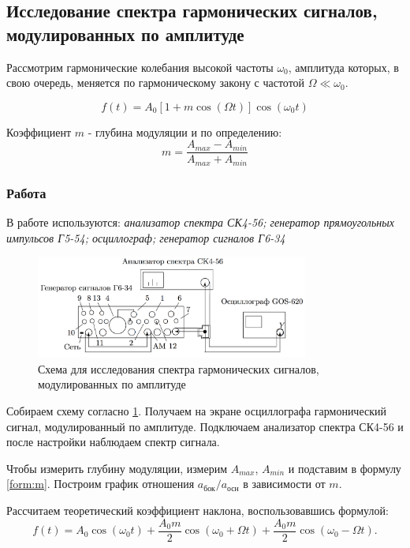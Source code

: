 \documentclass[a4paper, 12pt]{article}
\begin{document}
\subsection*{Исследование спектра гармонических сигналов, модулированных по амплитуде}

Рассмотрим гармонические колебания высокой частоты $\omega_0$, амплитуда которых, в свою очередь, меняется по гармоническому закону с частотой $\Omega \ll \omega_0$.

\begin{equation}
\label{form:amf(t)_a_n}
	f(t) = A_0[1+m\cos(\Omega t)]\cos(\omega_0t)
\end{equation}

Коэффициент $m$ - глубина модуляции и по определению:
\begin{equation}
\label{form:m}
	m = \frac{A_{max}-A_{min}}{A_{max}+A_{min}}
\end{equation}

\subsubsection*{Работа}
В работе используются: \textit{анализатор спектра СК4-56; генератор прямоугольных импульсов Г5-54; осциллограф; генератор сигналов Г6-34}

\begin{figure}[H]
\centering
\includegraphics[width = 0.8\textwidth]{schemeC}
\caption{Схема для исследования спектра гармонических сигналов, модулированных по амплитуде}
\label{img:scheme C}
\end{figure}

Собираем схему согласно \ref{img:scheme C}. Получаем на экране осциллографа гармонический сигнал, модулированный по амплитуде. Подключаем анализатор спектра СК4-56 и после настройки наблюдаем спектр сигнала.

Чтобы измерить глубину модуляции, измерим $A_{max}$, $A_{min}$ и подставим в формулу \ref{form:m}. Построим график отношения $a_\text{бок}/a_\text{осн}$ в зависимости от $m$.

Рассчитаем теоретический коэффициент наклона, воспользовавшись формулой:
\begin{equation}
\label{form:a/a(m)}
	f(t)=A_0\cos(\omega_0t)+	\frac{A_0m}{2}\cos(\omega_0+\Omega t)+\frac{A_0m}{2}\cos(\omega_0-\Omega t). 
\end{equation}
\end{document}
